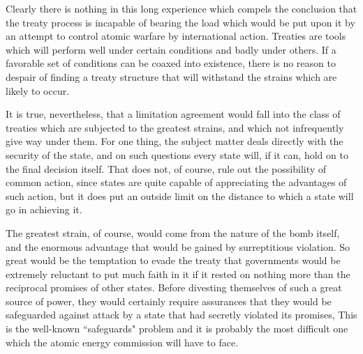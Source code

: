 \begin{introduction}
Clearly there is nothing in this long experience which compels the conclusion that the treaty process is incapable of bearing the load which would be put upon it by an attempt to control atomic warfare by international action. Treaties are tools which will perform well under certain conditions and badly under others. If a favorable set of conditions can be coaxed into existence, there is no reason to despair of finding a treaty structure that will withstand the strains which are likely to occur.

It is true, nevertheless, that a limitation agreement would fall into the class of treaties which are subjected to the greatest strains, and which not infrequently give way under them. For one thing, the subject matter deals directly with the security of the state, and on such questions every state will, if it can, hold on to the final decision itself. That does not, of course, rule out the possibility of common action, since states are quite capable of appreciating the advantages of such action, but it does put an outside limit on the distance to which a state will go in achieving it.

The greatest strain, of course, would come from the nature of the bomb itself, and the enormous advantage that would be gained by surreptitious violation. So great would be the temptation to evade the treaty that governments would be extremely reluctant to put much faith in it if it rested on nothing more than the reciprocal promises of other states. Before divesting themselves of such a great source of power, they would certainly require assurances that they would be safeguarded against attack by a state that had secretly violated its promises, This is the well-known ``safeguards" problem and it is probably the most difficult one which the atomic energy commission will have to face.


\end{introduction}
